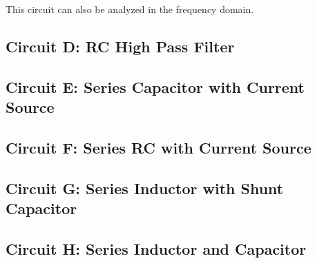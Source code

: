 \documentclass[main.tex]{subfiles}
\begin{document}

This circuit can also be analyzed in the frequency domain. 



\subsection{Circuit D: RC High Pass Filter}

\subsection{Circuit E: Series Capacitor with Current Source}

\subsection{Circuit F: Series RC with Current Source}

\subsection{Circuit G: Series Inductor with Shunt Capacitor}

\subsection{Circuit H: Series Inductor and Capacitor}
\end{document}
